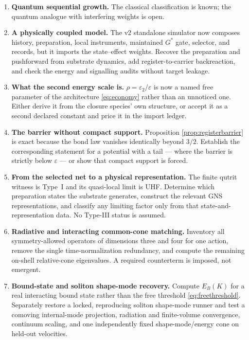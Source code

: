\documentclass[11pt,a4paper]{article}
\theoremstyle{definition}
\theoremstyle{plain}
\theoremstyle{remark}
\begin{document}
\begin{enumerate}
order. Operational hiding is conditionally reduced by
Proposition~\ref{prop:hiding}, but the substrate Born/Bell hypothesis and
common-cone tests remain open.
\item \textbf{Quantum sequential growth.} The classical classification is
known; the quantum analogue with interfering weights is open.
\item \textbf{A physically coupled model.} The v2 standalone simulator now
composes history, preparation, local instruments, maintained $G^*$ gate,
selector, and records, but it imports the state--effect weights. Recover the
preparation and pushforward from substrate dynamics, add register-to-carrier
backreaction, and check the energy and signalling audits without target
leakage.
\item \textbf{What the second energy scale is.} $\rho =
\varepsilon_2/\varepsilon$ is now a named free parameter of the
architecture \eqref{eq:economy} rather than an unnoticed one. Either
derive it from the closure species' own structure, or accept it as a
second declared constant and price it in the import ledger.
\par\smallskip
\item \textbf{The barrier without compact support.} Proposition
\ref{prop:registerbarrier} is exact because the bond law vanishes
identically beyond $3/2$. Establish the corresponding statement for a
potential with a tail --- where the barrier is strictly below
$\varepsilon$ --- or show that compact support is forced.
\item \textbf{From the selected net to a physical representation.} The
finite qutrit witness is Type~I and its quasi-local limit is UHF. Determine
which preparation states the substrate generates, construct the relevant GNS
representations, and classify any limiting factor only from that
state-and-representation data. No Type-III status is assumed.
\item \textbf{Radiative and interacting common-cone matching.} Inventory
all symmetry-allowed operators of dimensions three and four for one action,
remove the single time-normalization redundancy, and compute the remaining
on-shell relative-cone eigenvalues. A required counterterm is imposed, not
emergent.
\item \textbf{Bound-state and soliton shape-mode recovery.} Compute $E_B(K)$ for a real
interacting bound state rather than the free threshold
\eqref{eq:freethreshold}. Separately restore a locked, reproducing soliton
shape-mode runner and test a comoving internal-mode projection, radiation and
finite-volume convergence, continuum scaling, and one independently fixed
shape-mode/energy cone on held-out velocities.
\end{enumerate}
\end{document}
